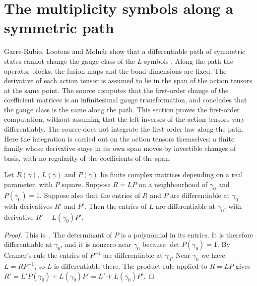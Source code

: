 \section{The multiplicity symbols along a symmetric path}
\label{sec:glm_l_symbol_path}

Garre-Rubio, Lootens and Moln\'ar show that a differentiable path of
symmetric states cannot change the gauge class of the $L$-symbols
\cite[Section~5]{GarreRubio2023MPOSym}. Along the path the operator blocks,
the fusion maps and the bond dimensions are fixed. The derivative of each
action tensor is assumed to lie in the span of the action tensors at the
same point. The source computes that the first-order change of the
coefficient matrices is an infinitesimal gauge transformation, and concludes
that the gauge class is the same along the path. This section proves the
first-order computation, without assuming that the left inverses of the
action tensors vary differentiably. The source does not integrate the
first-order law along the path. Here the integration is carried out on the
action tensors themselves: a finite family whose derivative stays in its own
span moves by invertible changes of basis, with no regularity of the
coefficients of the span.

\begin{lemma}
    \leanok
    \label{lem:glm_l_path_quotient_rule}
    Let $R(\gamma)$, $L(\gamma)$ and $P(\gamma)$ be finite complex matrices
    depending on a real parameter, with $P$ square. Suppose $R=LP$ on a
    neighbourhood of $\gamma_0$ and $P(\gamma_0)=1$. Suppose also that the
    entries of $R$ and $P$ are differentiable at $\gamma_0$ with derivatives
    $R'$ and $P'$. Then the entries of $L$ are differentiable at $\gamma_0$,
    with derivative $R'-L(\gamma_0)P'$.
\end{lemma}
\begin{proof}
    \leanok
    This is~\cite[``A first-order quotient rule'']{QICLean2026Blueprint}.
    The determinant of $P$ is a polynomial in its entries. It is therefore
    differentiable at $\gamma_0$, and it is nonzero near $\gamma_0$ because
    $\det P(\gamma_0)=1$. By Cramer's rule the entries of $P^{-1}$ are
    differentiable at $\gamma_0$. Near $\gamma_0$ we have $L=RP^{-1}$, so
    $L$ is differentiable there. The product rule applied to $R=LP$ gives
    $R'=L'P(\gamma_0)+L(\gamma_0)P'=L'+L(\gamma_0)P'$.
\end{proof}

